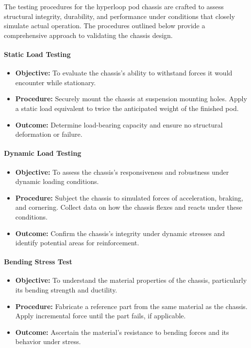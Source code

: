 The testing procedures for the hyperloop pod chassis are crafted to assess structural integrity, durability, and performance under conditions that closely simulate actual operation. The procedures outlined below provide a comprehensive approach to validating the chassis design.

\paragraph{Static Load Testing}
\begin{itemize}
    \item \textbf{Objective:} To evaluate the chassis's ability to withstand forces it would encounter while stationary.
    \item \textbf{Procedure:} Securely mount the chassis at suspension mounting holes. Apply a static load equivalent to twice the anticipated weight of the finished pod.
    \item \textbf{Outcome:} Determine load-bearing capacity and ensure no structural deformation or failure.
\end{itemize}

\paragraph{Dynamic Load Testing}
\begin{itemize}
    \item \textbf{Objective:} To assess the chassis's responsiveness and robustness under dynamic loading conditions.
    \item \textbf{Procedure:} Subject the chassis to simulated forces of acceleration, braking, and cornering. Collect data on how the chassis flexes and reacts under these conditions.
    \item \textbf{Outcome:} Confirm the chassis's integrity under dynamic stresses and identify potential areas for reinforcement.
\end{itemize}

\paragraph{Bending Stress Test}
\begin{itemize}
    \item \textbf{Objective:} To understand the material properties of the chassis, particularly its bending strength and ductility.
    \item \textbf{Procedure:} Fabricate a reference part from the same material as the chassis. Apply incremental force until the part fails, if applicable.
    \item \textbf{Outcome:} Ascertain the material's resistance to bending forces and its behavior under stress.
\end{itemize}


